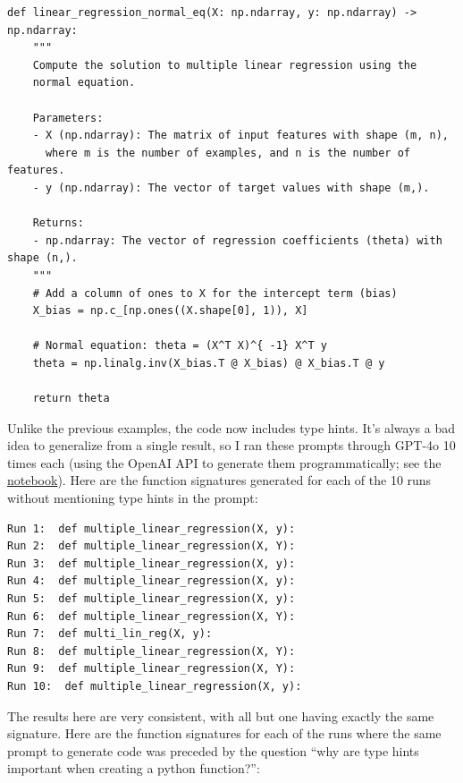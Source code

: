 \begin{lstlisting}
def linear_regression_normal_eq(X: np.ndarray, y: np.ndarray) -> np.ndarray:
    """
    Compute the solution to multiple linear regression using the 
    normal equation.

    Parameters:
    - X (np.ndarray): The matrix of input features with shape (m, n), 
      where m is the number of examples, and n is the number of features.
    - y (np.ndarray): The vector of target values with shape (m,).

    Returns:
    - np.ndarray: The vector of regression coefficients (theta) with shape (n,).
    """
    # Add a column of ones to X for the intercept term (bias)
    X_bias = np.c_[np.ones((X.shape[0], 1)), X]
    
    # Normal equation: theta = (X^T X)^{ -1} X^T y
    theta = np.linalg.inv(X_bias.T @ X_bias) @ X_bias.T @ y
    
    return theta
\end{lstlisting}

Unlike the previous examples, the code now includes type hints.
It's always a bad idea to generalize from a single result, so I ran these prompts through GPT-4o 10 times each (using the OpenAI API to generate them programmatically; see the \href{../src/bettercode/incontext\_learning\_example.ipynb}{notebook}).
Here are the function signatures generated for each of the 10 runs without mentioning type hints in the prompt:

\begin{lstlisting}
Run 1:  def multiple_linear_regression(X, y):
Run 2:  def multiple_linear_regression(X, Y):
Run 3:  def multiple_linear_regression(X, y):
Run 4:  def multiple_linear_regression(X, y):
Run 5:  def multiple_linear_regression(X, y):
Run 6:  def multiple_linear_regression(X, Y):
Run 7:  def multi_lin_reg(X, y):
Run 8:  def multiple_linear_regression(X, Y):
Run 9:  def multiple_linear_regression(X, Y):
Run 10:  def multiple_linear_regression(X, y):
\end{lstlisting}

The results here are very consistent, with all but one having exactly the same signature.
Here are the function signatures for each of the runs where the same prompt to generate code was preceded by the question ``why are type hints important when creating a python function?'':


